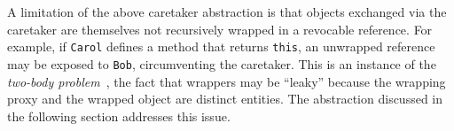 \documentclass{sig-alternate}
\begin{document}
A limitation of the above caretaker abstraction is that objects exchanged via the caretaker are themselves not recursively wrapped in a revocable reference. For example, if \texttt{Carol} defines a method that returns \texttt{this}, an unwrapped reference may be exposed to \texttt{Bob}, circumventing the caretaker. This is an instance of the \emph{two-body problem}~\cite{eugster06uniform}, the fact that wrappers may be ``leaky'' because the wrapping proxy and the wrapped object are distinct entities. The abstraction discussed in the following section addresses this issue.





\end{document}
